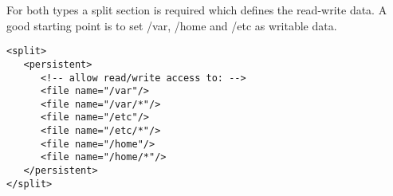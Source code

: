 For both types a split section is required which defines the read-write
data. A good starting point is to set /var, /home and /etc as writable
data.

\begin{Command}{12cm}
\begin{verbatim}
<split>
   <persistent>
      <!-- allow read/write access to: -->
      <file name="/var"/>
      <file name="/var/*"/>
      <file name="/etc"/>
      <file name="/etc/*"/>
      <file name="/home"/>
      <file name="/home/*"/>
   </persistent>
</split>
\end{verbatim}
\end{Command}
